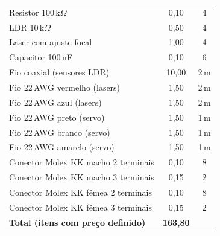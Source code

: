 \begin{table}[!htpb]
\begin{tabular}{lcc}
Resistor 100\,k$\Omega$                & 0,10 & 4  \\
LDR 10\,k$\Omega$                      & 0,50 & 4  \\
Laser com ajuste focal                 & 1,00 & 4  \\
Capacitor 100\,nF                      & 0,10 & 6  \\
Fio coaxial (sensores LDR)             & 10,00 & 2\,m \\
Fio 22\,AWG vermelho (lasers)          & 1,50 & 2\,m \\
Fio 22\,AWG azul (lasers)              & 1,50 & 2\,m \\
Fio 22\,AWG preto (servo)              & 1,50 & 1\,m \\
Fio 22\,AWG branco (servo)             & 1,50 & 1\,m \\
Fio 22\,AWG amarelo (servo)            & 1,50 & 1\,m \\
Conector Molex KK macho 2 terminais    & 0,10 & 8  \\
Conector Molex KK macho 3 terminais    & 0,15 & 2  \\
Conector Molex KK fêmea 2 terminais    & 0,10 & 8  \\
Conector Molex KK fêmea 3 terminais    & 0,15 & 2  \\
\hline
\textbf{Total (itens com preço definido)} & \textbf{163,80} & \\
\hline
\end{tabular}
\end{table}

